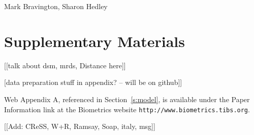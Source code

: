 \documentclass[useAMS,referee]{biom}
\begin{document}
Mark Bravington, Sharon Hedley

\vspace*{-8pt}


\section*{Supplementary Materials}

[[talk about dsm, mrds, Distance here]]

[data preparation stuff in appendix? -- will be on github]]

Web Appendix A, referenced in Section~\ref{s:model}, is available under the Paper Information link at the Biometrics website {\tt http://www.biometrics.tibs.org}.\vspace*{-8pt}



[[Add: CReSS, W+R, Ramsay, Soap, italy, msg]]
\end{document}
